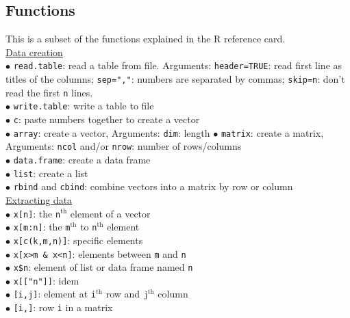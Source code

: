 \documentclass[a4paper,11pt,twocolumn,tablecaptionabove]{scrartcl}
\begin{document}
\subsection{Functions}

This is a subset of the functions explained in the R reference card.\\

\noindent \underline{Data creation}\\
$\bullet$ \texttt{read.table}: read a table from file. Arguments: \texttt{header=TRUE}: read first line as titles of the columns; \texttt{sep=","}: numbers are separated by commas; \texttt{skip=n}: don't read the first \texttt{n} lines.\\
$\bullet$ \texttt{write.table}: write a table to file\\
$\bullet$ \texttt{c}: paste numbers together to create a vector\\
$\bullet$ \texttt{array}: create a vector, Arguments: \texttt{dim}: length
$\bullet$ \texttt{matrix}: create a matrix, Arguments: \texttt{ncol} and/or \texttt{nrow}: number of rows/columns\\
$\bullet$ \texttt{data.frame}: create a data frame\\
$\bullet$ \texttt{list}: create a list\\
$\bullet$ \texttt{rbind} and \texttt{cbind}: combine vectors into a matrix by row or column\\

\noindent \underline{Extracting data}\\
$\bullet$ \texttt{x[n]}: the \texttt{n}$\mathrm{^{th}}$ element of a vector\\
$\bullet$ \texttt{x[m:n]}: the \texttt{m}$\mathrm{^{th}}$ to \texttt{n}$\mathrm{^{th}}$ element\\
$\bullet$ \texttt{x[c(k,m,n)]}: specific elements\\
$\bullet$ \texttt{x[x>m \& x<n]}: elements between \texttt{m} and \texttt{n}\\
$\bullet$ \verb!x$n!:  element of list or data frame named \texttt{n}\\  %
$\bullet$ \texttt{x[["n"]]}: idem\\
$\bullet$ \texttt{[i,j]}: element at \texttt{i}$\mathrm{^{th}}$ row and\texttt{ }j$\mathrm{^{th}}$ column \\
$\bullet$ \texttt{[i,]}: row \texttt{i} in a matrix\\
\end{document}
